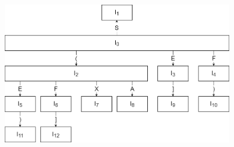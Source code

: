 \documentclass[a4paper,10pt]{jsarticle}
\begin{document}
\begin{figure}[H]
  \centering
  \includegraphics[width=10cm]{./01.png}
\end{figure}

\section{}
\end{document}
